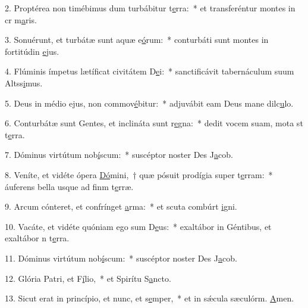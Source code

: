 2. Proptérea non timébimus dum turbábitur t\uline{e}rra:~* et transferéntur montes in cr m\uline{a}ris.\par 
3. Sonuérunt, et turbátæ sunt aquæ e\uline{ó}rum:~* conturbáti sunt montes in fortitúdin \uline{e}jus.\par 
4. Flúminis ímpetus lætíficat civitátem D\uline{e}i:~* sanctificávit tabernáculum suum Altss\uline{i}mus.\par 
5. Deus in médio ejus, non commov\uline{é}bitur:~* adjuvábit eam Deus mane dilc\uline{u}lo.\par 
6. Conturbátæ sunt Gentes, et inclináta sunt r\uline{e}gna:~* dedit vocem suam, mota st t\uline{e}rra.\par 
7. Dóminus virtútum nob\uline{í}scum:~* suscéptor noster Des J\uline{a}cob.\par 
8. Veníte, et vidéte ópera \uline{Dó}mini,~† quæ pósuit prodígia super t\uline{e}rram:~* áuferens bella usque ad finm t\uline{e}rræ.\par 
9. Arcum cónteret, et confrínget \uline{a}rma:~* et scuta combúrt \uline{i}gni.\par 
10. Vacáte, et vidéte quóniam ego sum D\uline{e}us:~* exaltábor in Géntibus, et exaltábor n t\uline{e}rra.\par 
11. Dóminus virtútum nob\uline{í}scum:~* suscéptor noster Des J\uline{a}cob.\par 
12. Glória Patri, et F\uline{í}lio,~* et Spirítu S\uline{a}ncto.\par 
13. Sicut erat in princípio, et nunc, et s\uline{e}mper,~* et in sǽcula sæculórm. \uline{A}men.\par 

